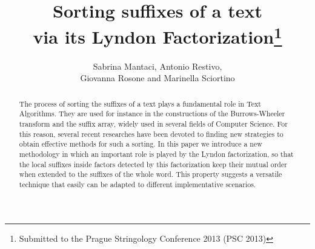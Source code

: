 \documentclass[envcountsame,runningheads]{llncs}
\begin{document}
\title{Sorting suffixes of a text \\ via its Lyndon Factorization\thanks{Submitted to the Prague Stringology Conference 2013 (PSC 2013)}}

\author{Sabrina Mantaci, Antonio Restivo,\\
Giovanna Rosone and Marinella Sciortino}

\newcommand{\ppom} {\preceq_\omega}
\newcommand{\pplex}{\leq_{lex}}

\newcommand{\pom} {\prec_\omega}
\newcommand{\plex}{<_{lex}}



\def\lbwt(#1){{bwt}(#1)}
\def\lbwt{{bwt}}


\def\bigT{W}

\def\bwtS#1{\textsf{bwt}_{#1}(\mathcal{S})}
\def\lcpS#1{\textsf{lcp}_{#1}(\mathcal{S})} \def\bwtw#1{\textsf{bwt}_{#1}({w})}
\def\lcpw#1{\textsf{LCP}_{#1}({w})}
\def\rank{\textsf{rank}}
\def\bigS{\mathcal{S}}
\def\BCR{\texttt{BCR}}
\def\BWT{BWT} \def\LCP{LCP} \def\SA{SA} \def\GSA{GSA} \def\BCRLCP{\texttt{extLCP}}
\def\EMBWT{\texttt{BCRext} }
\def\EMBWTpp{\texttt{BCRext++} }
\def\BWTE{\texttt{bwte}}
\def\sort#1{\textrm{sort}(#1)}


\newcommand{\fbwt}{{\mathcal B}{\mathcal W}{\mathcal T}}


\maketitle

\begin{abstract}
The process of sorting the suffixes of a text plays a fundamental role in Text Algorithms. They are used for instance in the constructions of the Burrows-Wheeler transform and the suffix array, widely used in several fields of Computer Science. For this reason, several recent researches have been devoted to finding new strategies to obtain effective methods for such a sorting. In this paper we introduce a new methodology in which an important role is played by the Lyndon factorization, so that the local suffixes inside factors detected by this factorization keep their mutual order when extended to the suffixes of the whole word. This property suggests a versatile technique that easily can be adapted to different implementative scenarios.
\end{abstract}
\end{document}
